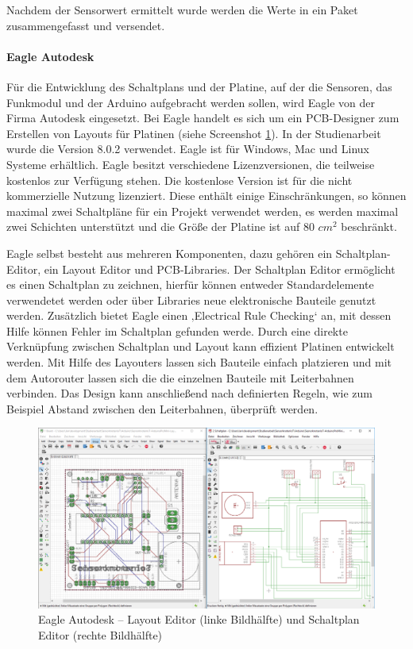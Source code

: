 Nachdem der Sensorwert ermittelt wurde werden die Werte in ein Paket zusammengefasst und versendet.  
\paragraph{Eagle Autodesk} Für die Entwicklung des Schaltplans und der Platine, auf der die Sensoren,  das Funkmodul und der Arduino aufgebracht werden sollen, wird Eagle von der Firma Autodesk eingesetzt.  Bei Eagle handelt es sich um ein \ac{PCB}-Designer zum Erstellen von Layouts für Platinen (siehe Screenshot \ref{img:EagleAutodesk}). In der Studienarbeit wurde die Version 8.0.2 verwendet. Eagle ist für Windows, Mac und Linux Systeme erhältlich. Eagle besitzt verschiedene Lizenzversionen, die teilweise kostenlos zur Verfügung stehen. Die kostenlose Version ist für die nicht kommerzielle Nutzung lizenziert. Diese enthält einige Einschränkungen, so können maximal zwei Schaltpläne für ein Projekt verwendet werden, es werden maximal zwei Schichten unterstützt und die Größe der Platine ist auf 80 $cm^{2}$ beschränkt.

Eagle selbst besteht aus mehreren Komponenten, dazu gehören ein Schaltplan-Editor, ein Layout Editor und \ac{PCB}-Libraries. Der Schaltplan Editor ermöglicht es einen Schaltplan zu zeichnen, hierfür können entweder Standardelemente verwendetet werden oder über Libraries neue elektronische Bauteile genutzt werden. Zusätzlich bietet Eagle einen ‚Electrical Rule Checking‘ an, mit dessen Hilfe können Fehler im Schaltplan gefunden werde. Durch eine direkte Verknüpfung zwischen Schaltplan und Layout kann effizient Platinen entwickelt werden. Mit Hilfe des Layouters lassen sich Bauteile einfach platzieren und mit dem Autorouter lassen sich die die einzelnen Bauteile mit Leiterbahnen verbinden. Das Design kann anschließend nach definierten Regeln, wie zum Beispiel Abstand zwischen den Leiterbahnen, überprüft werden. 
\begin{figure}
	\centering
	\includegraphics[width=1\textwidth]{bilder/Eagle.png}
	\caption[Eagle Autodesk – Layout Editor und Schaltplan Editor]{Eagle Autodesk – Layout Editor (linke Bildhälfte) und Schaltplan Editor (rechte Bildhälfte)}
	\label{img:EagleAutodesk}
\end{figure}
